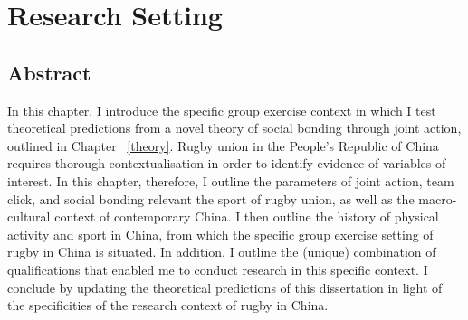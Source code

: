 
\chapter{\label{researchSetting}Research Setting}


\minitoc




\section{Abstract}

In this chapter, I introduce the specific group exercise context in which I test theoretical predictions from a novel theory of social bonding through joint action, outlined in Chapter ~\ref{theory}.  Rugby union in the People's Republic of China requires thorough contextualisation in order to identify evidence of variables of interest.  In this chapter, therefore, I outline the parameters of joint action, team click, and social bonding relevant the sport of rugby union, as well as the macro-cultural context of contemporary China.  I then outline the history of physical activity and sport in China, from which the specific group exercise setting of rugby in China is situated.   In addition, I outline the (unique) combination of qualifications that enabled me to conduct research in this specific context.  I conclude by updating the theoretical predictions of this dissertation in light of the specificities of the research context of rugby in China.


